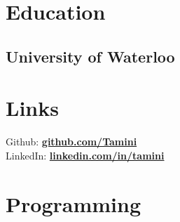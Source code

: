 \documentclass[letterpaper]{deedy-resume-modified} %
\begin{document}



\begin{minipage}[t]{0.33\textwidth} %


\section{Education} 

\subsection{University of Waterloo}


\sectionspace %


\section{Links} 

Github: \href{https://github.com/Tamini}{\bf github.com/Tamini} \\
LinkedIn: \href{https://www.linkedin.com/in/tamini}{\bf linkedin.com/in/tamini} \\

\sectionspace %


\section{Programming}


\end{minipage}
\end{document}
